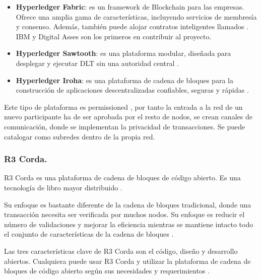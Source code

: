 \begin{itemize}
    \item \textbf{Hyperledger Fabric}: es un framework de Blockchain para las empresas. Ofrece una amplia gama de 
    características, incluyendo servicios de membresía y consenso. Además, también puede alojar contratos inteligentes 
    llamados . IBM y Digital Asses son los primeros en contribuir al proyecto.
    \item \textbf{Hyperledger Sawtooth}: es una plataforma modular, diseñada para desplegar y ejecutar DLT sin una
    autoridad central \cite{top-blockchain-platforms-app2}.
    \item \textbf{Hyperledger Iroha}: es una plataforma de cadena de bloques para la construcción de aplicaciones 
    descentralizadas confiables, seguras y rápidas \cite{top-blockchain-platforms-app2}.
\end{itemize}

\noindent Este tipo de plataforma es permissioned \cite{public-private-blockchain, top-blockchain-platforms-app2}, 
por tanto la entrada a la red de un nuevo participante ha de ser aprobada por el resto de nodos, se crean canales de 
comunicación, donde se implementan la privacidad de transacciones. Se puede catalogar como subredes dentro de la propia 
red.

\subsubsection*{R3 Corda.}

R3 Corda es una plataforma de cadena de bloques de código abierto. Es una tecnología de libro mayor distribuido 
\cite{top-blockchain-platforms-app}.

\vspace{5mm}

\noindent Su enfoque es bastante diferente de la cadena de bloques tradicional, donde una transacción necesita ser 
verificada por muchos nodos. Su enfoque es reducir el número de validaciones y mejorar la eficiencia mientras se 
mantiene intacto todo el conjunto de características de la cadena de bloques \cite{top-blockchain-platforms-app}.

\vspace{5mm}

\noindent Las tres características clave de R3 Corda son el código, diseño y desarrollo abiertos. Cualquiera puede usar 
R3 Corda y utilizar la plataforma de cadena de bloques de código abierto según sus necesidades y requerimientos 
\cite{top-blockchain-platforms-app}. 

